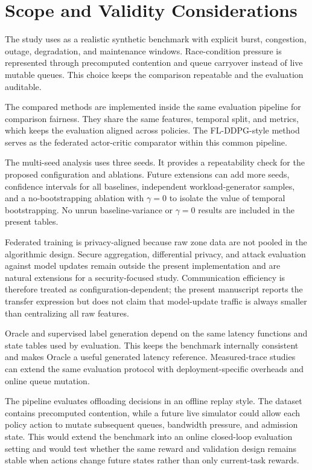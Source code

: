 \section{Scope and Validity Considerations}
\label{sec:limitations}

The study uses \dataset{} as a realistic synthetic benchmark with explicit burst, congestion, outage, degradation, and maintenance windows. Race-condition pressure is represented through precomputed contention and queue carryover instead of live mutable queues. This choice keeps the comparison repeatable and the evaluation auditable.

The compared methods are implemented inside the same evaluation pipeline for comparison fairness. They share the same features, temporal split, and metrics, which keeps the evaluation aligned across policies. The FL-DDPG-style method serves as the federated actor-critic comparator within this common pipeline.

The multi-seed analysis uses three seeds. It provides a repeatability check for the proposed configuration and ablations. Future extensions can add more seeds, confidence intervals for all baselines, independent workload-generator samples, and a no-bootstrapping ablation with $\gamma=0$ to isolate the value of temporal bootstrapping. No unrun baseline-variance or $\gamma=0$ results are included in the present tables.

Federated training is privacy-aligned because raw zone data are not pooled in the algorithmic design. Secure aggregation, differential privacy, and attack evaluation against model updates remain outside the present implementation and are natural extensions for a security-focused study. Communication efficiency is therefore treated as configuration-dependent; the present manuscript reports the transfer expression but does not claim that model-update traffic is always smaller than centralizing all raw features.

Oracle and supervised label generation depend on the same latency functions and state tables used by evaluation. This keeps the benchmark internally consistent and makes Oracle a useful generated latency reference. Measured-trace studies can extend the same evaluation protocol with deployment-specific overheads and online queue mutation.

The pipeline evaluates offloading decisions in an offline replay style. The dataset contains precomputed contention, while a future live simulator could allow each policy action to mutate subsequent queues, bandwidth pressure, and admission state. This would extend the benchmark into an online closed-loop evaluation setting and would test whether the same reward and validation design remains stable when actions change future states rather than only current-task rewards.
